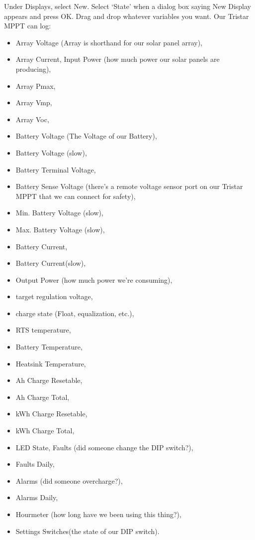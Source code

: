 Under Displays, select New. 
Select ‘State’ when a dialog box saying New Display appears and press OK.
Drag and drop whatever variables you want. Our Tristar MPPT can log:
\begin{itemize}
	\item Array Voltage (Array is shorthand for our solar panel array), 
	\item Array Current, Input Power (how much power our solar panels are producing), 
	\item Array Pmax, 
	\item Array Vmp, 
	\item Array Voc, 
	\item Battery Voltage (The Voltage of our Battery), 
	\item Battery Voltage (slow), 
	\item Battery Terminal Voltage, 
	\item Battery Sense Voltage (there’s a remote voltage sensor port on our Tristar MPPT that we can connect for safety), 
	\item Min. Battery Voltage (slow), 
	\item Max. Battery Voltage (slow), 
	\item Battery Current, 
	\item Battery Current(slow), 
	\item Output Power (how much power we’re consuming), 
	\item target regulation voltage, 
	\item charge state (Float, equalization, etc.), 
	\item RTS temperature, 
	\item Battery Temperature, 
	\item Heatsink Temperature, 
	\item Ah Charge Resetable, 
	\item Ah Charge Total, 
	\item kWh Charge Resetable, 
	\item kWh Charge Total, 
	\item LED State, Faults (did someone change the DIP switch?), 
	\item Faults Daily, 
	\item Alarms (did someone overcharge?), 
	\item Alarms Daily, 
	\item Hourmeter (how long have we been using this thing?),
	\item Settings Switches(the state of our DIP switch).
\end{itemize}

